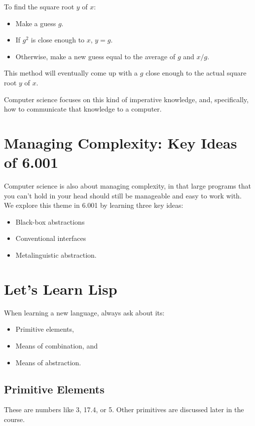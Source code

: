 \documentclass[9pt]{report}
\begin{document}
To find the square root \(y\) of \(x\):
\begin{itemize}
\item Make a guess \(g\).
\item If \(g^2\) is close enough to \(x\), \(y=g\).
\item Otherwise, make a new guess equal to the average of \(g\) and \(x/g\).
\end{itemize}

This method will eventually come up with a \(g\) close enough to the
actual square root \(y\) of \(x\).

Computer science focuses on this kind of imperative knowledge, and,
specifically, how to communicate that knowledge to a computer.

\section{Managing Complexity: Key Ideas of 6.001}
\label{sec:orgc1649ab}
Computer science is also about managing complexity, in that large
programs that you can't hold in your head should still be manageable
and easy to work with. We explore this theme in 6.001 by learning
three key ideas:

\begin{itemize}
\item Black-box abstractions
\item Conventional interfaces
\item Metalinguistic abstraction.
\end{itemize}


\section{Let's Learn Lisp}
\label{sec:org739c7ec}
When learning a new language, always ask about its:
\begin{itemize}
\item Primitive elements,
\item Means of combination, and
\item Means of abstraction.
\end{itemize}

\subsection{Primitive Elements}
\label{sec:orgdd6f173}
These are numbers like 3, 17.4, or 5. Other primitives are
discussed later in the course.
\end{document}
